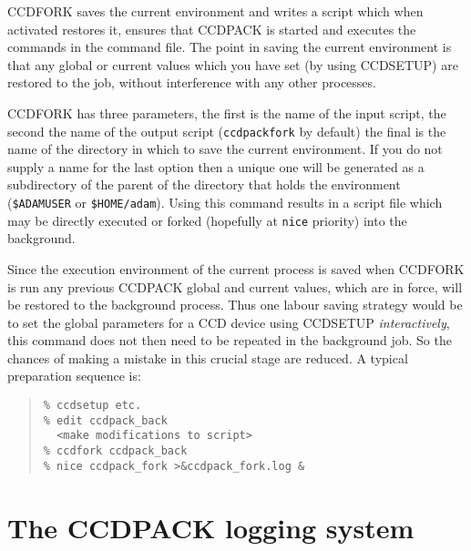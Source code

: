 \documentclass[twoside,11pt]{article}
\newcommand{\htmlref}[2]{#1}
\newcommand{\latexhtml}[2]{#1}
\newcommand{\xlabel}[1]{}
\renewcommand{\_}{\texttt{\symbol{95}}}
\newcommand{\ttsize}{\latexhtml{\small}{}}
\newenvironment{myquote}{\begin{quote}\ttsize}{\end{quote}}
\newcommand{\text}[1]{{\ttsize \tt #1}}
\newcommand{\routine}[1]{{\sc #1}}
\newcommand{\xroutine}[1]{\htmlref{{\sc #1}}{#1}}
\begin{document}
\routine{CCDFORK} saves the current environment and writes a script which
when activated restores it, ensures that CCDPACK is
started and executes the commands in the command file. The point in
saving the current environment is that any global or current values
which you have set (by using \xroutine{CCDSETUP}) are restored to the job,
without interference with any other processes.

\routine{CCDFORK} has three parameters, the first is the name of the input
script, the second the name of the output script (\text{ccdpack\_fork} by
default) the final is the name of the directory in which to save the
current environment. If you do not supply a name for the last option
then a unique one will be generated as a subdirectory of the parent of
the directory that holds the environment (\text{\$ADAM\_USER} or
\text{\$HOME/adam}). Using this command results in a script file which may be
directly executed or forked (hopefully at \text{nice} priority) into
the background.

Since the execution environment of the current process is saved
when \routine{CCDFORK} is run any previous CCDPACK global and current values,
which are in force, will be restored to the background process. Thus
one labour saving strategy would be to set the global parameters for a
CCD device using \routine{CCDSETUP} {\em interactively}, this command does not
then need to be repeated in the background job.  So the chances
of making a mistake in this crucial stage are reduced. A typical
preparation sequence is:
\begin{myquote}
\begin{verbatim}
% ccdsetup etc.
% edit ccdpack_back
  <make modifications to script>
% ccdfork ccdpack_back
% nice ccdpack_fork >&ccdpack_fork.log &
\end{verbatim}
\end{myquote}

\section{The CCDPACK logging system \xlabel{logsystem} \label{logsystem}}
\end{document}
